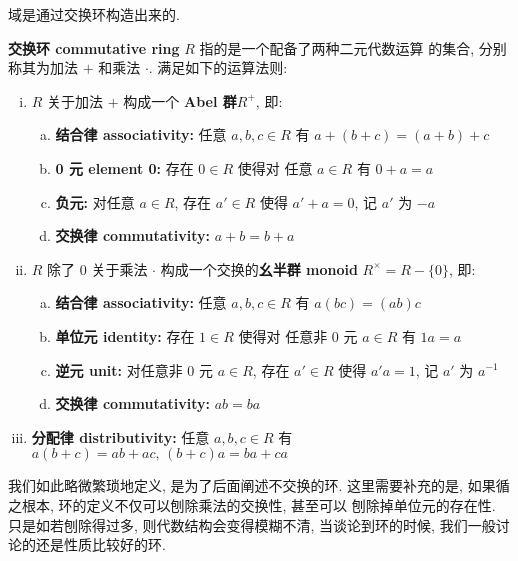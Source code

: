 \documentclass[UTF8]{book}
\begin{document}
域是通过交换环构造出来的. 
\begin{definition}
    \textbf{交换环 commutative ring} $R$ 指的是一个配备了两种二元代数运算
    的集合, 分别称其为加法 $+$ 和乘法 $\cdot$. 满足如下的运算法则: 
    \begin{enumerate}[(i)]
        \item $R$ 关于加法 $+$ 构成一个\textbf{ Abel 群}$R^{+}$, 即:
            \begin{enumerate}[(a)]
                \item \textbf{结合律 associativity:} 任意 $a,b,c \in R$ 有
                $a+(b+c) = (a+b)+c$
                \item \textbf{0 元 element 0:} 存在 $ 0 \in R$ 使得对
                任意 $a\in R$ 有 $ 0+a = a$
                \item \textbf{负元:} 对任意 $a\in R$, 存在 $a' \in R$ 
                使得 $a' + a = 0$, 记 $a'$ 为 $-a$
                \item \textbf{交换律 commutativity:} $ a+b =b+a$
            \end{enumerate}
            \item $R$ 除了 0 关于乘法 $\cdot$ 构成一个交换的\textbf{幺半群 monoid}
             $ R^{\times} = R - \{0\} $, 即:
            \begin{enumerate}[(a)]
                \item \textbf{结合律 associativity:} 任意 $a,b,c \in R$ 有
                $a(bc) = (ab)c$
                \item \textbf{单位元 identity:} 存在 $ 1 \in R$ 使得对
                任意非 0 元 $a\in R$ 有 $ 1a = a$
                \item \textbf{逆元 unit:} 对任意非 0 元 $a\in R$, 存在 $a' \in R$ 
                使得 $a'a = 1$, 记 $a'$ 为 $a^{-1}$
                \item \textbf{交换律 commutativity:} $ ab =ba$
            \end{enumerate}
        \item \textbf{分配律 distributivity:} 任意 $a,b,c \in R$ 有
        $ a(b+c) = ab + ac,\, (b+c)a = ba + ca$
    \end{enumerate}
\end{definition}

我们如此略微繁琐地定义, 是为了后面阐述不交换的环. 
这里需要补充的是, 如果循之根本, 环的定义不仅可以刨除乘法的交换性, 甚至可以
刨除掉单位元的存在性. 只是如若刨除得过多, 则代数结构会变得模糊不清, 
当谈论到环的时候, 我们一般讨论的还是性质比较好的环. 
\end{document}
